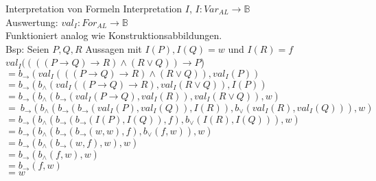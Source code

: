 \begin{frame}{Interpretation von Formeln}
	Interpretation $I$, $I: Var_{AL}\longrightarrow\mathbb{B}$\\
	Auswertung: $val_{I}: For_{AL}\longrightarrow\mathbb{B}$\\
	Funktioniert analog wie Konstruktionsabbildungen.\\
	Bsp: Seien $P, Q, R$ Aussagen mit $I(P), I(Q) = w$ und $I(R) = f$\\
	$val_{I}((((P\rightarrow Q)\rightarrow R)\wedge(R\vee Q))\rightarrow P$)\\ %
	$=b_{\rightarrow}(val_{I}(((P\rightarrow Q)\rightarrow R)\wedge(R\vee Q)), val_{I}(P))$\\
	$=b_{\rightarrow}(b_{\wedge}(val_{I}((P\rightarrow Q)\rightarrow R),val_{I}(R\vee Q)), I(P))$\\
	$=b_{\rightarrow}(b_{\wedge}(b_{\rightarrow}(val_{I}(P\rightarrow Q), val_{I}(R)), val_{I}(R\vee Q)), w)$\\
	$=~b_{\rightarrow}(b_{\wedge}(b_{\rightarrow}(b_{\rightarrow}(val_{I}(P), val_{I}(Q)), I(R)), b_{\vee}(val_{I}(R), val_{I}(Q))), w)$\\
	$=b_{\rightarrow}(b_{\wedge}(b_{\rightarrow}(b_{\rightarrow}(I(P), I(Q)), f), b_{\vee}(I(R), I(Q))), w)$\\
	$=b_{\rightarrow}(b_{\wedge}(b_{\rightarrow}(b_{\rightarrow}(w, w), f), b_{\vee}(f, w)), w)$\\
	$=b_{\rightarrow}(b_{\wedge}(b_{\rightarrow}(w, f), w), w)$\\
	$=b_{\rightarrow}(b_{\wedge}(f, w), w)$\\
	$=b_{\rightarrow}(f, w)$\\
	$=w$\\
\end{frame}

